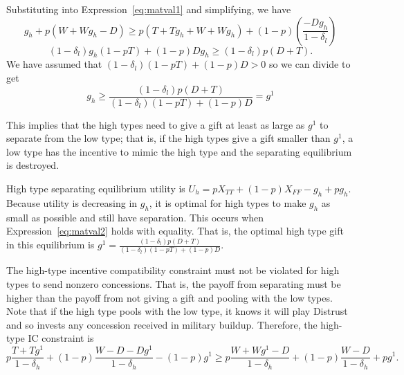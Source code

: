 \documentclass[bibtex,autowc]{apsr_submission}
\newcommand{\de}{\delta}
\begin{document}
{Substituting into Expression~\ref{eq:matval1} and simplifying, we have
\begin{equation*}
	g_h + p(W+Wg_h-D) \geq p\left(T + Tg_h +W + Wg_h \right) + (1-p)\left( \frac{-Dg_h}{1-\de_l}  \right)
\end{equation*}
\begin{equation*}
	\left(1-\de_l\right)g_h\left(1 - pT \right) + (1-p) Dg_h\geq \left(1-\de_l\right)p\left(D +	 T\right).
\end{equation*}
We have assumed that $\left(1-\de_l\right)\left(1 - pT \right) + (1-p) D > 0$ so we can divide to get
\begin{equation}
	g_h \geq \frac{\left(1-\de_l\right)p\left(D +	 T\right)}{\left(1-\de_l\right)\left(1 - pT \right) + (1-p) D} = g^1
	\label{eq:matval2}
\end{equation}

This implies that the high types need to give a gift at least as large as $g^1$ to separate from the low type; that is, if the high types give a gift smaller than $g^1$, a low type has the incentive to mimic the high type and the separating equilibrium is destroyed.

High type separating equilibrium utility is $U_h= pX_{TT}+(1-p)X_{FF} - g_h+pg_h$. Because utility is decreasing in $g_h$, it is optimal for high types to make $g_h$ as small as possible and still have separation. This occurs when Expression~\ref{eq:matval2} holds with equality. That is, the optimal high type gift in this equilibrium is $g^1 = \frac{\left(1-\de_l\right)p\left(D +	 T\right)}{\left(1-\de_l\right)\left(1 - pT \right) + (1-p) D}$.

The high-type incentive compatibility constraint must not be violated for high types to send nonzero concessions. That is, the payoff from separating must be higher than the payoff from not giving a gift and pooling with the low types. Note that if the high type pools with the low type, it knows it will play Distrust and so invests any concession received in military buildup. Therefore, the high-type IC constraint is
\begin{equation*}
	p\frac{T+Tg^1}{1-\de_h} + (1-p)\frac{W-D-Dg^1}{1-\de_h} - (1-p)g^1 \geq 
	p\frac{W+Wg^1-D}{1-\de_h} + (1-p)\frac{W-D}{1-\de_h} +pg^1.
\label{eq:matval3}
\end{equation*}

}
\end{document}
